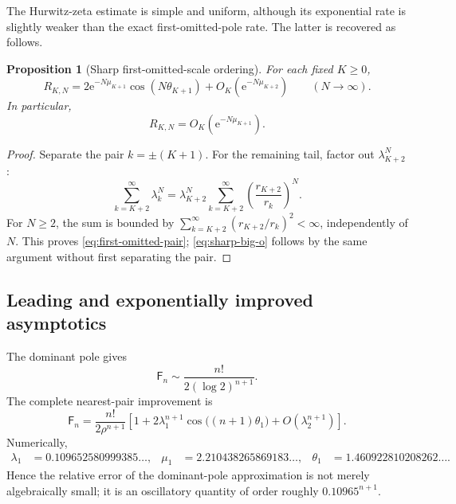 \documentclass[11pt,oneside]{article}
\numberwithin{equation}{section}
\newtheorem{proposition}[theorem]{Proposition}
\newcommand{\e}{\mathrm e}
\newcommand{\Fub}{\mathsf F}
\newcommand{\paren}[1]{\left(#1\right)}
\begin{document}
The Hurwitz-zeta estimate is simple and uniform, although its exponential rate is slightly weaker than the exact first-omitted-pole rate.  The latter is recovered as follows.

\begin{proposition}[Sharp first-omitted-scale ordering]
\label{prop:sharp-ordering}
For each fixed \(K\ge0\),
\begin{equation}
 R_{K,N}=2\e^{-N\mu_{K+1}}\cos(N\theta_{K+1})
 +O_K\!\paren{\e^{-N\mu_{K+2}}}
 \qquad(N\to\infty).
 \label{eq:first-omitted-pair}
\end{equation}
In particular,
\begin{equation}
 R_{K,N}=O_K\!\paren{\e^{-N\mu_{K+1}}}.
 \label{eq:sharp-big-o}
\end{equation}
\end{proposition}

\begin{proof}
Separate the pair \(k=\pm(K+1)\).  For the remaining tail, factor out \(\lambda_{K+2}^N\):
\[
 \sum_{k=K+2}^{\infty}\lambda_k^N
 =\lambda_{K+2}^N
  \sum_{k=K+2}^{\infty}\paren{\frac{r_{K+2}}{r_k}}^N.
\]
For \(N\ge2\), the sum is bounded by
\(\sum_{k=K+2}^{\infty}(r_{K+2}/r_k)^2<\infty\), independently of \(N\).  This proves \cref{eq:first-omitted-pair}; \cref{eq:sharp-big-o} follows by the same argument without first separating the pair.
\end{proof}

\subsection{Leading and exponentially improved asymptotics}

The dominant pole gives
\begin{equation}
 \Fub_n\sim\frac{n!}{2(\log2)^{n+1}}.
 \label{eq:classical-leading}
\end{equation}
The complete nearest-pair improvement is
\begin{equation}
 \Fub_n=\frac{n!}{2\rho^{n+1}}
 \left[1+2\lambda_1^{n+1}
 \cos\!\bigl((n+1)\theta_1\bigr)
 +O\!\paren{\lambda_2^{n+1}}\right].
 \label{eq:first-exponential-improvement}
\end{equation}
Numerically,
\begin{align}
 \lambda_1&=0.109652580999385\ldots,
 &\mu_1&=2.210438265869183\ldots,
 &\theta_1&=1.460922810208262\ldots.
 \label{eq:first-action-numerics}
\end{align}
Hence the relative error of the dominant-pole approximation is not merely algebraically small; it is an oscillatory quantity of order roughly \(0.10965^{n+1}\).
\end{document}
